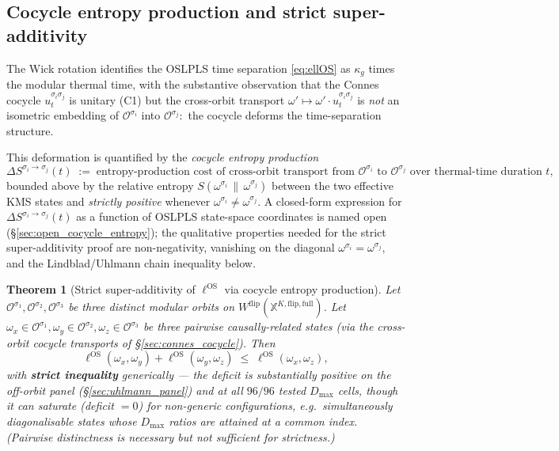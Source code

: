 \documentclass[11pt,a4paper]{article}
\theoremstyle{plain}
\newtheorem{theorem}{Theorem}[section]
\theoremstyle{definition}
\newcommand{\Ocal}{\mathcal{O}}
\newcommand{\kappag}{\kappa_{g}}
\newcommand{\ellOS}{\ell^{\mathrm{OS}}}
\newcommand{\Wflip}{W^{\mathrm{flip}}}
\newcommand{\osXkrein}{\mathbb{X}^{K,\mathrm{flip},\mathrm{full}}}
\newcommand{\Oorb}[1]{\Ocal^{\sigma_{#1}}}
\newcommand{\omegaOrb}[1]{\omega^{\sigma_{#1}}}
\newcommand{\cocyc}[2]{u_{t}^{\sigma_{#1}\sigma_{#2}}}
\newcommand{\DelS}[2]{\Delta S^{\sigma_{#1}\to\sigma_{#2}}}
\begin{document}
\subsection{Cocycle entropy production and strict super-additivity}
\label{sec:strict_super_additivity}

The Wick rotation identifies the OSLPLS time separation
\eqref{eq:ellOS} as $\kappag$ times the modular thermal time, with the
substantive observation that the Connes cocycle $\cocyc{i}{j}$ is
unitary (C1) but the cross-orbit transport $\omega'\mapsto
\omega'\cdot\cocyc{i}{j}$ is \emph{not} an isometric embedding of
$\Oorb{i}$ into $\Oorb{j}$:\ the cocycle deforms the
time-separation structure.

This deformation is quantified by the \emph{cocycle entropy production}
\begin{equation}
  \DelS{i}{j}(t) \;:=\; \text{entropy-production cost of cross-orbit transport from }\Oorb{i}\text{ to }\Oorb{j}\text{ over thermal-time duration }t,
  \label{eq:cocycle_entropy_production}
\end{equation}
bounded above by the relative entropy
$S(\omegaOrb{i}\,\|\,\omegaOrb{j})$ between the two effective KMS
states and \emph{strictly positive} whenever $\omegaOrb{i}\ne
\omegaOrb{j}$. A closed-form expression for $\DelS{i}{j}(t)$ as a
function of OSLPLS state-space coordinates is named open
(\S\ref{sec:open_cocycle_entropy}); the qualitative properties needed
for the strict super-additivity proof are non-negativity, vanishing
on the diagonal $\omegaOrb{i}=\omegaOrb{j}$, and the Lindblad/Uhlmann
chain inequality below.

\begin{theorem}[Strict super-additivity of $\ellOS$ via cocycle entropy
production]\label{thm:strict_super_additivity}
Let $\Oorb{1},\Oorb{2},\Oorb{3}$ be three distinct modular orbits on
$\Wflip(\osXkrein)$. Let $\omega_{x}\in\Oorb{1},\omega_{y}\in\Oorb{2},
\omega_{z}\in\Oorb{3}$ be three pairwise causally-related states (via
the cross-orbit cocycle transports of
\S\ref{sec:connes_cocycle}). Then
\begin{equation}
  \ellOS(\omega_{x},\omega_{y}) + \ellOS(\omega_{y},\omega_{z}) \;\le\; \ellOS(\omega_{x},\omega_{z}),
  \label{eq:strict_super_additivity}
\end{equation}
with \textbf{strict inequality} generically --- the deficit is
substantially positive on the off-orbit panel (\S\ref{sec:uhlmann_panel})
and at all $96/96$ tested $D_{\max}$ cells, though it can \emph{saturate}
(deficit $=0$) for non-generic configurations, e.g.\ simultaneously
diagonalisable states whose $D_{\max}$ ratios are attained at a common
index. (Pairwise distinctness is necessary but not sufficient for
strictness.)
\end{theorem}
\end{document}
